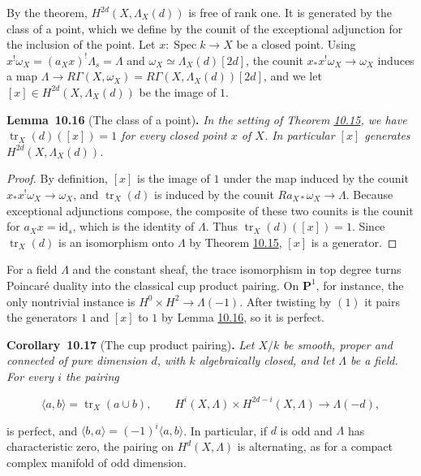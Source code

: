 \documentclass[11pt]{article}
\newenvironment{bpstatement}[2]{\par\addvspace{0.6\baselineskip}\noindent\textbf{#1}#2\textbf{.}\enspace\ignorespaces}
  {\par\addvspace{0.4\baselineskip}}
\newenvironment{bpstatementit}[2]{\begin{bpstatement}{#1}{#2}\itshape\ignorespaces}{\end{bpstatement}}
\begin{document}
\label{bp148}%
By the theorem, \(H^{2d}(X,\Lambda_X(d))\) is free of rank one. It is generated by the class of a point, which we define by the counit of the exceptional adjunction for the inclusion of the point. Let \(x:\operatorname{Spec}k\to X\) be a closed point. Using \(x^!\omega_X=(a_Xx)^!\Lambda_s=\Lambda\) and \(\omega_X\simeq\Lambda_X(d)[2d]\), the counit \(x_*x^!\omega_X\to\omega_X\) induces a map \(\Lambda\to R\Gamma(X,\omega_X)=R\Gamma(X,\Lambda_X(d))[2d]\), and we let \([x]\in H^{2d}(X,\Lambda_X(d))\) be the image of \(1\).

\label{bp149}%
\begin{bpstatementit}{Lemma~10.16}{ (The class of a point)}
In the setting of Theorem \hyperref[bp146]{10.15}, we have \(\operatorname{tr}_X(d)([x])=1\) for every closed point \(x\) of \(X\). In particular \([x]\) generates \(H^{2d}(X,\Lambda_X(d))\).
\end{bpstatementit}

\begin{proof}[{Proof}]\label{bp150}%
By definition, \([x]\) is the image of \(1\) under the map induced by the counit \(x_*x^!\omega_X\to\omega_X\), and \(\operatorname{tr}_X(d)\) is induced by the counit \(Ra_{X*}\omega_X\to\Lambda\). Because exceptional adjunctions compose, the composite of these two counits is the counit for \(a_Xx=\mathrm{id}_s\), which is the identity of \(\Lambda\). Thus \(\operatorname{tr}_X(d)([x])=1\). Since \(\operatorname{tr}_X(d)\) is an isomorphism onto \(\Lambda\) by Theorem \hyperref[bp146]{10.15}, \([x]\) is a generator.
\end{proof}

\label{bp151}%
For a field \(\Lambda\) and the constant sheaf, the trace isomorphism in top degree turns Poincaré duality into the classical cup product pairing. On \(\mathbf P^1\), for instance, the only nontrivial instance is \(H^0\times H^2\to\Lambda(-1)\). After twisting by \((1)\) it pairs the generators \(1\) and \([x]\) to \(1\) by Lemma \hyperref[bp149]{10.16}, so it is perfect.

\label{bp152}%
\begin{bpstatementit}{Corollary~10.17}{ (The cup product pairing)}
Let \(X/k\) be smooth, proper and connected of pure dimension \(d\), with \(k\) algebraically closed, and let \(\Lambda\) be a field. For every \(i\) the pairing

\[
\langle a,b\rangle=\operatorname{tr}_X(a\cup b),\qquad
H^i(X,\Lambda)\times H^{2d-i}(X,\Lambda)\longrightarrow\Lambda(-d),
\]

is perfect, and \(\langle b,a\rangle=(-1)^i\langle a,b\rangle\). In particular, if \(d\) is odd and \(\Lambda\) has characteristic zero, the pairing on \(H^d(X,\Lambda)\) is alternating, as for a compact complex manifold of odd dimension.
\end{bpstatementit}
\end{document}
